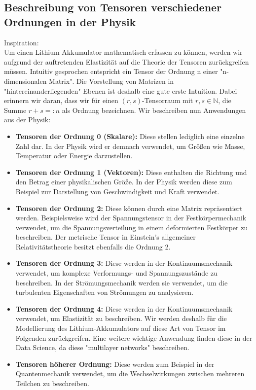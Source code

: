 \subsection{Beschreibung von Tensoren verschiedener Ordnungen in der Physik}{\label{subsec:tensorphy}}
Inspiration: \cite{NasaTensors} \\
Um einen Lithium-Akkumulator mathematisch erfassen zu können, werden wir aufgrund der auftretenden Elastizität auf die Theorie der Tensoren zurückgreifen müssen. Intuitiv gesprochen entspricht ein Tensor der Ordnung n einer "n-dimensionalen Matrix". Die Vorstellung von Matrizen in "hintereinanderliegenden" Ebenen ist deshalb eine gute erste Intuition. Dabei erinnern wir daran, dass wir für einen \((r,s)\)-Tensorraum mit \(r,s \in \mathbb{N}\), die Summe \(r+s =: n\) als Ordnung bezeichnen. Wir beschreiben nun Anwendungen aus der Physik:
\begin{itemize}
    \item \textbf{Tensoren der Ordnung 0 (Skalare):} Diese stellen lediglich eine einzelne Zahl dar. In der Physik wird er demnach verwendet, um Größen wie Masse, Temperatur oder Energie darzustellen.

    \item \textbf{Tensoren der Ordnung 1 (Vektoren):} Diese enthalten die Richtung und den Betrag einer physikalischen Größe. In der Physik werden diese zum Beispiel zur Darstellung von Geschwindigkeit und Kraft verwendet.

    \item \textbf{Tensoren der Ordnung 2:} Diese können durch eine Matrix repräsentiert werden. Beispielsweise wird der Spannungstensor in der Festkörpermechanik verwendet, um die Spannungsverteilung in einem deformierten Festkörper zu beschreiben. Der metrische Tensor in Einstein's allgemeiner Relativitätstheorie besitzt ebenfalls die Ordnung 2.

    \item \textbf{Tensoren der Ordnung 3:} Diese werden in der Kontinuumsmechanik verwendet, um komplexe Verformungs- und Spannungszustände zu beschreiben. In der Strömungsmechanik werden sie verwendet, um die turbulenten Eigenschaften von Strömungen zu analysieren.

    \item \textbf{Tensoren der Ordnung 4:} Diese werden in der Kontinuumsmechanik verwendet, um Elastizität zu beschreiben. Wir werden deshalb für die Modellierung des Lithium-Akkumulators auf diese Art von Tensor im Folgenden zurückgreifen. Eine weitere wichtige Anwendung finden diese in der Data Science, da diese "multilayer networks" beschreiben.
    
    \item \textbf{Tensoren höherer Ordnung:} Diese werden zum Beispiel in der Quantenmechanik verwendet, um die Wechselwirkungen zwischen mehreren Teilchen zu beschreiben.
\end{itemize}
